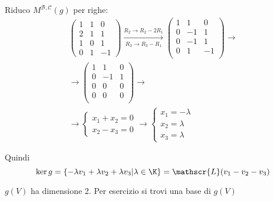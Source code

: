 \documentclass[twoside, 11pt, titlepage]{article}
\begin{document}
{	Riduco $ M^{\mathscr{B}, \mathscr{C}}(g) $ per righe:
	\begin{gather*}
		\begin{pmatrix}
			1 & 1 & 0\\
			2 & 1 & 1\\
			1 & 0 & 1\\
			0 & 1 & -1
		\end{pmatrix} \xrightarrow[R_{3} \to R_3-R_1 ]{R_{2}\to R_{2}-2R_1} \begin{pmatrix}
			1 & 1 & 0\\
			0 & -1 & 1\\
			0 & -1 & 1\\
			0 & 1 & -1\\
		\end{pmatrix}\to \\
		\to \begin{pmatrix}
			1 & 1 & 0\\
			0 & -1 & 1\\
			0 & 0 & 0\\
			0 & 0 & 0\\
		\end{pmatrix}\to\\ \to \begin{cases}
		x_1+x_2=0\\
		x_2-x_3=0	
		\end{cases}
		\to \begin{cases}
			x_1=- \lambda\\
			x_2= \lambda\\
			x_3= \lambda
		\end{cases}
	\end{gather*}

	Quindi \[ \ker g =\{- \lambda v_1+ \lambda v_2+ \lambda v_3 | \lambda \in\K\}= \mathscr{L}(v_1-v_2-v_3)\]

	$ g(V) $ ha dimensione 2. Per esercizio si trovi una base di $ g(V) $ %
}

\end{document}
